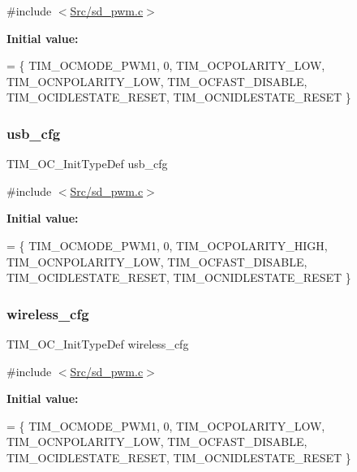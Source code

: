 {\ttfamily \#include $<$\mbox{\hyperlink{sd__pwm_8c}{Src/sd\+\_\+pwm.\+c}}$>$}

{\bfseries Initial value\+:}
\begin{DoxyCode}
= \{
    TIM\_OCMODE\_PWM1,
    0,
    TIM\_OCPOLARITY\_LOW,
    TIM\_OCNPOLARITY\_LOW,
    TIM\_OCFAST\_DISABLE,
    TIM\_OCIDLESTATE\_RESET,
    TIM\_OCNIDLESTATE\_RESET
\}
\end{DoxyCode}
\mbox{\label{group___s_d___p_w_m_ga3d73e8517034e997f36ad0ac5ca08c43}} 
\subsubsection{\texorpdfstring{usb\+\_\+cfg}{usb\_cfg}}
{\footnotesize\ttfamily T\+I\+M\+\_\+\+O\+C\+\_\+\+Init\+Type\+Def usb\+\_\+cfg\hspace{0.3cm}{\ttfamily [static]}}



{\ttfamily \#include $<$\mbox{\hyperlink{sd__pwm_8c}{Src/sd\+\_\+pwm.\+c}}$>$}

{\bfseries Initial value\+:}
\begin{DoxyCode}
= \{
    TIM\_OCMODE\_PWM1,
    0,
    TIM\_OCPOLARITY\_HIGH,
    TIM\_OCNPOLARITY\_LOW,
    TIM\_OCFAST\_DISABLE,
    TIM\_OCIDLESTATE\_RESET,
    TIM\_OCNIDLESTATE\_RESET
\}
\end{DoxyCode}
\mbox{\label{group___s_d___p_w_m_ga16e3d3aeb6a3dfc37eb50e66129a9014}} 
\subsubsection{\texorpdfstring{wireless\+\_\+cfg}{wireless\_cfg}}
{\footnotesize\ttfamily T\+I\+M\+\_\+\+O\+C\+\_\+\+Init\+Type\+Def wireless\+\_\+cfg\hspace{0.3cm}{\ttfamily [static]}}



{\ttfamily \#include $<$\mbox{\hyperlink{sd__pwm_8c}{Src/sd\+\_\+pwm.\+c}}$>$}

{\bfseries Initial value\+:}
\begin{DoxyCode}
= \{
    TIM\_OCMODE\_PWM1,
    0,
    TIM\_OCPOLARITY\_LOW,
    TIM\_OCNPOLARITY\_LOW,
    TIM\_OCFAST\_DISABLE,
    TIM\_OCIDLESTATE\_RESET,
    TIM\_OCNIDLESTATE\_RESET
\}
\end{DoxyCode}
